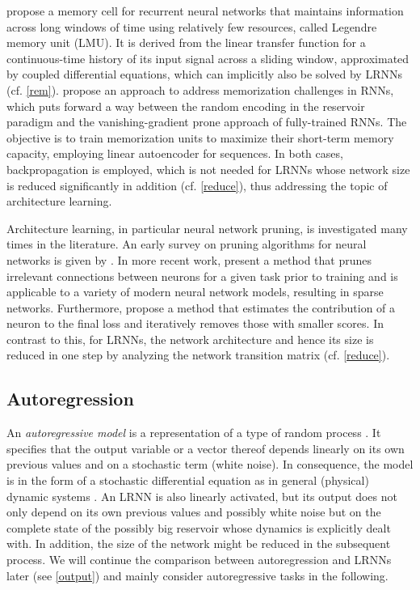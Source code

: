 \documentclass[twoside,11pt]{article}
\theoremstyle{definition}
\begin{document}
\citet{VKE19} propose a memory cell for recurrent neural networks that maintains
information across long windows of time using relatively few resources, called
Legendre memory unit (LMU). It is derived from the linear transfer function for
a continuous-time history of its input signal across a sliding window,
approximated by coupled differential equations, which can implicitly also be
solved by LRNNs (cf. \cref{rem}).
\citet{CSB21} propose an approach to address memorization challenges in RNNs,
which puts forward a way between the random encoding in the reservoir paradigm
and the vanishing-gradient prone approach of fully-trained RNNs. The objective
is to train memorization units to maximize their short-term memory capacity,
employing linear autoencoder for sequences. In both cases, backpropagation is
employed, which is not needed for LRNNs whose network size is reduced
significantly in addition (cf. \cref{reduce}), thus addressing the topic of
architecture learning.

Architecture learning, in particular neural network pruning, is
investigated many times in the literature. An early survey on pruning algorithms
for neural networks is given by \citet{Ree93}. In more recent work,
\citet{LAT19} present a method that prunes irrelevant connections between
neurons for a given task prior to training and is applicable to a variety of
modern neural network models, resulting in sparse networks. Furthermore,
\citet{MM+19} propose a method that estimates the contribution of a neuron to
the final loss and iteratively removes those with smaller scores. In contrast to
this, for LRNNs, the network architecture and hence its size is reduced in one
step by analyzing the network transition matrix (cf. \cref{reduce}).

\subsection{Autoregression}\label{regress}

An \emph{autoregressive model} is a representation of a type of random process
\citep{Aka69}. It specifies that the output variable or a vector thereof depends
linearly on its own previous values and on a stochastic term (white noise). In
consequence, the model is in the form of a stochastic differential equation as in
general (physical) dynamic systems \citep{CK14}. An LRNN is also linearly
activated, but its output does not only depend on its own previous values and
possibly white noise but on the complete state of the possibly big reservoir
whose dynamics is explicitly dealt with. In addition, the size of the network
might be reduced in the subsequent process. We will continue the comparison
between autoregression and LRNNs later (see \cref{output}) and mainly consider
autoregressive tasks in the following.
\end{document}
